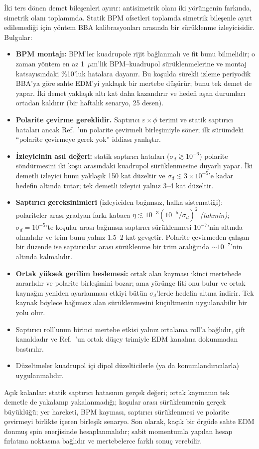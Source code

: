 \documentclass[11pt,a4paper]{article}
\newcommand{\tahmin}{\textit{(tahmin)}}
\begin{document}
İki ters dönen demet bileşenleri ayırır: antisimetrik olanı iki yörüngenin farkında, simetrik olanı toplamında.
Statik BPM ofsetleri toplamda simetrik bileşenle ayırt edilemediği için yöntem BBA kalibrasyonları arasında bir
sürüklenme izleyicisidir. Bulgular:
\begin{itemize}
\item \textbf{BPM montajı:} BPM'ler kuadrupole rijit bağlanmalı ve fit bunu bilmelidir; o zaman yöntem en az
1~$\mu$m'lik BPM--kuadrupol sürüklenmelerine ve montaj katsayısındaki \%10'luk hatalara dayanır. Bu koşulda
sürekli izleme periyodik BBA'ya göre sahte EDM'yi yaklaşık bir mertebe düşürür; bunu tek demet de yapar. İki
demet yaklaşık altı kat daha kazandırır ve hedefi aşan durumları ortadan kaldırır (bir haftalık senaryo, 25 desen).
\item \textbf{Polarite çevirme gereklidir.} Saptırıcı $\varepsilon\times\phi$ terimi ve statik saptırıcı
hataları ancak Ref.~\cite{omarov}'un polarite çevirmeli birleşimiyle söner; ilk sürümdeki ``polarite çevirmeye
gerek yok'' iddiası yanlıştır.
\item \textbf{İzleyicinin asıl değeri:} statik saptırıcı hataları ($\sigma_d\gtrsim10^{-6}$) polarite söndürmesini
iki koşu arasındaki kuadrupol sürüklenmesine duyarlı yapar. İki demetli izleyici bunu yaklaşık 150 kat düzeltir ve
$\sigma_d\lesssim3\times10^{-5}$'e kadar hedefin altında tutar; tek demetli izleyici yalnız 3--4 kat düzeltir.
\item \textbf{Saptırıcı gereksinimleri} (izleyiciden bağımsız, halka sistematiği): polariteler arası gradyan farkı
kabaca $\eta\lesssim10^{-3}(10^{-5}/\sigma_d)^2$ \tahmin; $\sigma_d=10^{-5}$'te koşular arası bağımsız saptırıcı
sürüklenmesi $10^{-7}$'nin altında olmalıdır ve trim bunu yalnız 1.5--2 kat gevşetir. Polarite çevirmeden
çalışan bir düzende ise saptırıcılar arası sürüklenme bir trim aralığında $\sim10^{-7}$'nin altında kalmalıdır.
\item \textbf{Ortak yüksek gerilim beslemesi:} ortak alan kayması ikinci mertebede zararlıdır ve polarite
birleşimini bozar; ama yörünge fiti onu bulur ve ortak kaynağın yeniden ayarlanması etkiyi bütün $\sigma_d$'lerde
hedefin altına indirir. Tek kaynak böylece bağımsız alan sürüklenmesini küçültmenin uygulanabilir bir yolu olur.
\item Saptırıcı roll'unun birinci mertebe etkisi yalnız ortalama roll'a bağlıdır, çift kanaldadır ve
Ref.~\cite{omarov}'un ortak düşey trimiyle EDM kanalına dokunmadan bastırılır.
\item Düzeltmeler kuadrupol içi dipol düzelticilerle (ya da konumlandırıcılarla) uygulanmalıdır.
\end{itemize}
Açık kalanlar: statik saptırıcı hatasının gerçek değeri; ortak kaymanın tek demetle de yakalanıp yakalanmadığı;
koşular arası sürüklenmenin gerçek büyüklüğü; yer hareketi, BPM kayması, saptırıcı sürüklenmesi ve polarite
çevirmeyi birlikte içeren birleşik senaryo. Son olarak, kaçık bir örgüde sahte EDM donmuş spin enerjisinde
hesaplanmalıdır; sabit momentumla yapılan hesap fırlatma noktasına bağlıdır ve mertebelerce farklı sonuç
verebilir.
\end{document}

